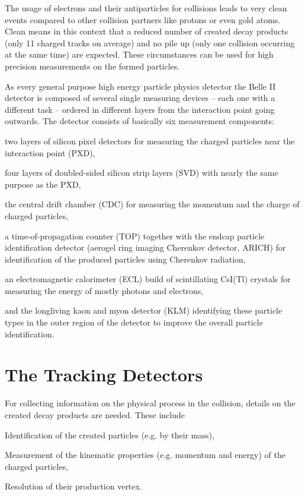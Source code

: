The usage of electrons and their antiparticles for collisions leads to very clean events compared to other collision partners like protons or even gold atoms. Clean means in this context that a reduced number of created decay products (only 11 charged tracks on average) and no pile up (only one collision occurring at the same time) are expected. These circumstances can be used for high precision measurements on the formed particles.

As every general purpose high energy particle physics detector the Belle II detector is composed of several single measuring devices -- each one with a different task -- ordered in different layers from the interaction point going outwards. The detector consists of basically six measurement components:
\begin{zlist}
  \item two layers of silicon pixel detectors for measuring the charged particles near the interaction point (PXD),
  \item four layers of doubled-sided silicon strip layers (SVD) with nearly the same purpose as the PXD,
  \item the central drift chamber (CDC) for measuring the momentum and the charge of charged particles,
  \item a time-of-propagation counter (TOP) together with the endcap particle identification detector (aerogel ring imaging Cherenkov detector, ARICH) for identification of the produced particles using Cherenkov radiation,
  \item an electromagnetic calorimeter (ECL) build of scintillating CsI(Tl) crystals for measuring the energy of mostly photons and electrons,
  \item and the longliving kaon and myon detector (KLM) identifying these particle types in the outer region of the detector to improve the overall particle identification.
\end{zlist}

\section{The Tracking Detectors}

For collecting information on the physical process in the collision, details on the created decay products are needed. These include
\begin{zlist}
 \item Identification of the created particles (e.g. by their mass),
 \item Measurement of the kinematic properties (e.g. momentum and energy) of the charged particles,
 \item Resolution of their production vertex.
\end{zlist}

